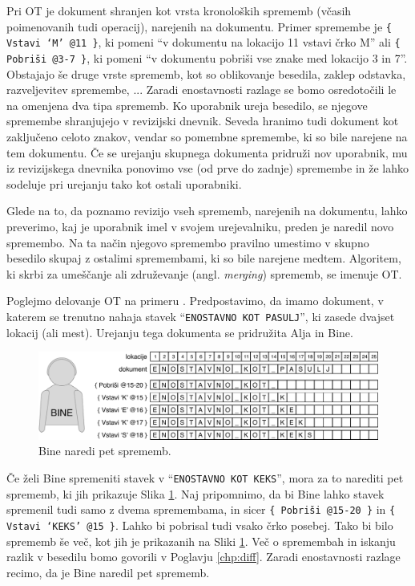 \documentclass[a4paper, 12pt, twoside]{book}
\begin{document}
Pri OT je dokument shranjen kot vrsta kronoloških sprememb (včasih poimenovanih tudi operacij), narejenih na dokumentu. Primer spremembe je {\tt \{ Vstavi ‘M’ @11 \}}, ki pomeni “v dokumentu na lokacijo 11 vstavi črko M” ali {\tt \{ Pobriši @3-7 \}}, ki pomeni “v dokumentu pobriši vse znake med lokacijo 3 in 7”. Obstajajo še druge vrste sprememb, kot so oblikovanje besedila, zaklep odstavka, razveljevitev spremembe, ... Zaradi enostavnosti razlage se bomo osredotočili le na omenjena dva tipa sprememb. Ko uporabnik ureja besedilo, se njegove spremembe shranjujejo v revizijski dnevnik. Seveda hranimo tudi dokument kot zaključeno celoto znakov, vendar so pomembne spremembe, ki so bile narejene na tem dokumentu. Če se urejanju skupnega dokumenta pridruži nov uporabnik, mu iz revizijskega dnevnika ponovimo vse (od prve do zadnje) spremembe in že lahko sodeluje pri urejanju tako kot ostali uporabniki.

Glede na to, da poznamo revizijo vseh sprememb, narejenih na dokumentu, lahko preverimo, kaj je uporabnik imel v svojem urejevalniku, preden je naredil novo spremembo. Na ta način njegovo spremembo pravilno umestimo v skupno besedilo skupaj z ostalimi spremembami, ki so bile narejene medtem. Algoritem, ki skrbi za umeščanje ali združevanje (angl. \textit{merging}) sprememb, se imenuje OT.

Poglejmo delovanje OT na primeru \cite{gdocs22}. Predpostavimo, da imamo dokument, v katerem se trenutno nahaja stavek “{\tt ENOSTAVNO KOT PASULJ}”, ki zasede dvajset lokacij (ali mest). Urejanju tega dokumenta se pridružita Alja in Bine.

\begin{figure}[placement h]
\begin{center}
\includegraphics[width=12cm]{img/ot1.pdf}
\end{center}
\caption{Bine naredi pet sprememb.}
\label{ot1}
\end{figure}

Če želi Bine spremeniti stavek v “{\tt ENOSTAVNO KOT KEKS}”, mora za to narediti pet sprememb, ki jih prikazuje Slika \ref{ot1}. Naj pripomnimo, da bi Bine lahko stavek spremenil tudi samo z dvema spremembama, in sicer {\tt \{ Pobriši @15-20 \}} in {\tt \{ Vstavi ‘KEKS’ @15 \}}. Lahko bi pobrisal tudi vsako črko posebej. Tako bi bilo sprememb še več, kot jih je prikazanih na Sliki \ref{ot1}. Več o spremembah in iskanju razlik v besedilu bomo govorili v Poglavju \ref{chp:diff}. Zaradi enostavnosti razlage recimo, da je Bine naredil pet sprememb.
\end{document}
